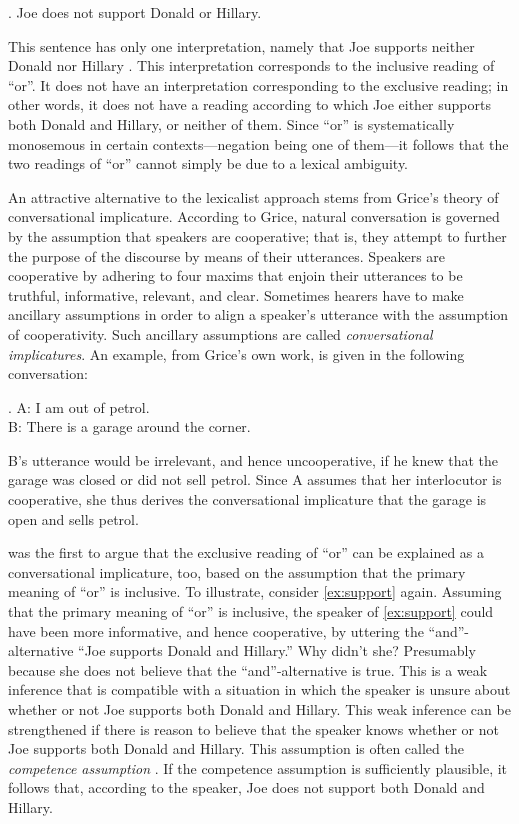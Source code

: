 \documentclass[12pt]{article}
\begin{document}
\ex.	 Joe does not support Donald or Hillary.

This sentence has only one interpretation, namely that Joe supports neither Donald nor Hillary \citep[cf.][]{crain2008}. This interpretation corresponds to the inclusive reading of ``or''. It does not have an interpretation corresponding to the exclusive reading; in other words, it does not have a reading according to which Joe either supports both Donald and Hillary, or neither of them. Since ``or'' is systematically monosemous in certain contexts---negation being one of them---it follows that the two readings of ``or'' cannot simply be due to a lexical ambiguity.

An attractive alternative to the lexicalist approach stems from Grice's \citeyearpar{grice1975} theory of conversational implicature. According to Grice, natural conversation is governed by the assumption that speakers are cooperative; that is, they attempt to further the purpose of the discourse by means of their utterances. Speakers are cooperative by adhering to four maxims that enjoin their utterances to be truthful, informative, relevant, and clear. Sometimes hearers have to make ancillary assumptions in order to align a speaker's utterance with the assumption of cooperativity. Such ancillary assumptions are called \emph{conversational implicatures}. An example, from Grice's own work, is given in the following conversation:

\ex.	A: I am out of petrol. \\
 B: There is a garage around the corner.
	
B's utterance would be irrelevant, and hence uncooperative, if he knew that the garage was closed or did not sell petrol. Since A assumes that her interlocutor is cooperative, she thus derives the conversational implicature that the garage is open and sells petrol.

\citet{horn1972} was the first to argue that the exclusive reading of ``or'' can be explained as
a conversational implicature, too, based on the assumption that the primary meaning of ``or'' is
inclusive. To illustrate, consider \ref{ex:support} again. Assuming that the primary meaning of
``or'' is inclusive, the speaker of \ref{ex:support} could have been more informative, and hence
cooperative, by uttering the ``and''-alternative ``Joe supports Donald and Hillary.'' Why didn't
she? Presumably because she does not believe that the ``and''-alternative is true. This is a weak
inference that is compatible with a situation in which the speaker is unsure about whether or
not Joe supports both Donald and Hillary. This weak inference can be strengthened if there is
reason to believe that the speaker knows whether or not Joe supports both Donald and
Hillary. This assumption is often called the \emph{competence assumption}
\citep[e.g.,][]{geurts2010, Russell2006:Against-Grammat, vanRooijSchulz:ExhaustiveInterpretation, ZimmermannFreeChoiceDisjunction2000}. If
the competence assumption is sufficiently plausible, it follows that, according to the speaker,
Joe does not support both Donald and Hillary.
\end{document}
